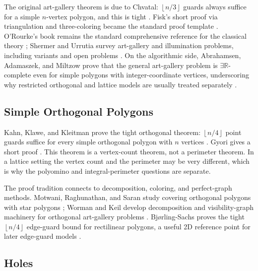 \documentclass[11pt]{article}
\newcommand{\floor}[1]{\left\lfloor #1 \right\rfloor}
\begin{document}
The original art-gallery theorem is due to Chvatal: $\floor{n/3}$ guards
always suffice for a simple $n$-vertex polygon, and this is tight
\cite{Chvatal1975}.  Fisk's short proof via triangulation and three-coloring
became the standard proof template \cite{Fisk1978}.  O'Rourke's book remains
the standard comprehensive reference for the classical theory
\cite{ORourke1987}; Shermer and Urrutia survey art-gallery and illumination
problems, including variants and open problems \cite{Shermer1992,Urrutia2000}.
On the algorithmic side, Abrahamsen, Adamaszek, and Miltzow prove that the
general art-gallery problem is $\exists\mathbb{R}$-complete even for simple
polygons with integer-coordinate vertices, underscoring why restricted
orthogonal and lattice models are usually treated separately
\cite[Theorem~1]{AbrahamsenAdamaszekMiltzow2022}.

\subsection{Simple Orthogonal Polygons}

Kahn, Klawe, and Kleitman prove the tight orthogonal theorem:
$\floor{n/4}$ point guards suffice for every simple orthogonal polygon with
$n$ vertices \cite{KahnKlaweKleitman1983}.  Gyori gives a short proof
\cite{Gyori1986}.  This theorem is a vertex-count theorem, not a perimeter
theorem.  In a lattice setting the vertex count and the perimeter may be very
different, which is why the polyomino and integral-perimeter questions are
separate.

The proof tradition connects to decomposition, coloring, and perfect-graph
methods.  Motwani, Raghunathan, and Saran study covering orthogonal polygons
with star polygons \cite{MotwaniRaghunathanSaran1990}; Worman and Keil develop
decomposition and visibility-graph machinery for orthogonal art-gallery
problems \cite{WormanKeil2007}.  Bj{\o}rling-Sachs proves the tight
$\floor{n/4}$ edge-guard bound for rectilinear polygons, a useful 2D reference
point for later edge-guard models \cite{BjorlingSachs1998}.

\subsection{Holes}
\end{document}
